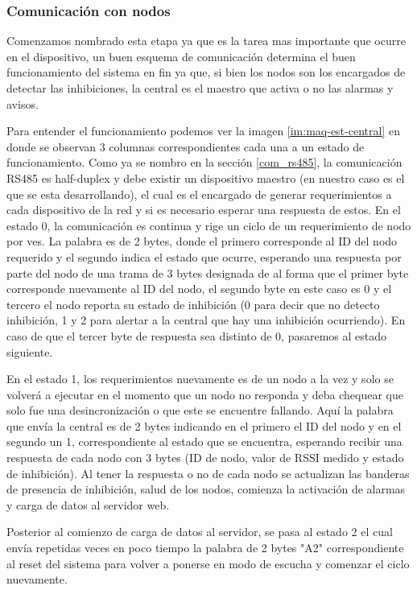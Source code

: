 \subsubsection{Comunicación con nodos}
\par Comenzamos nombrado esta etapa ya que es la tarea mas importante que ocurre en el dispositivo, un buen esquema de comunicación determina el buen funcionamiento del sistema en fin ya que, si bien los nodos son los encargados de detectar las inhibiciones, la central es el maestro que activa o no las alarmas y avisos. 
\par Para entender el funcionamiento podemos ver la imagen \ref{im:maq-est-central} en donde se observan 3 columnas correspondientes cada una a un estado de funcionamiento.
Como ya se nombro en la sección \ref{com_rs485}, la comunicación RS485 es half-duplex y debe existir un dispositivo maestro (en nuestro caso es el que se esta desarrollando), el cual es el encargado de generar requerimientos a cada dispositivo de la red y si es necesario esperar una respuesta de estos. 
En el estado 0, la comunicación es continua y rige un ciclo de un requerimiento de nodo por ves. La palabra es de 2 bytes, donde el primero corresponde al ID del nodo requerido y el segundo indica el estado que ocurre, esperando una respuesta por parte del nodo de una trama de 3 bytes designada de al forma que el primer byte corresponde nuevamente al ID del nodo, el segundo byte en este caso es 0 y el tercero el nodo reporta su estado de inhibición (0 para decir que no detecto inhibición, 1 y 2 para alertar a la central que hay una inhibición ocurriendo). En caso de que el tercer byte de respuesta sea distinto de 0, pasaremos al estado siguiente.
\par En el estado 1, los requerimientos nuevamente es de un nodo a la vez y solo se volverá a ejecutar en el momento que un nodo no responda y deba chequear que solo fue una desincronización o que este se encuentre fallando. Aquí la palabra que envía la central es de 2 bytes indicando en el primero el ID del nodo y en el segundo un 1, correspondiente al estado que se encuentra, esperando recibir una respuesta de cada nodo con 3 bytes (ID de nodo, valor de RSSI medido y estado de inhibición). Al tener la respuesta o no de cada nodo se actualizan las banderas de presencia de inhibición, salud de los nodos, comienza la activación de alarmas y carga de datos al servidor web. 
\par Posterior al comienzo de carga de datos al servidor, se pasa al estado 2 el cual envía repetidas veces en poco tiempo la palabra de 2 bytes "A2" correspondiente al reset del sistema para volver a ponerse en modo de escucha y comenzar el ciclo nuevamente. 

